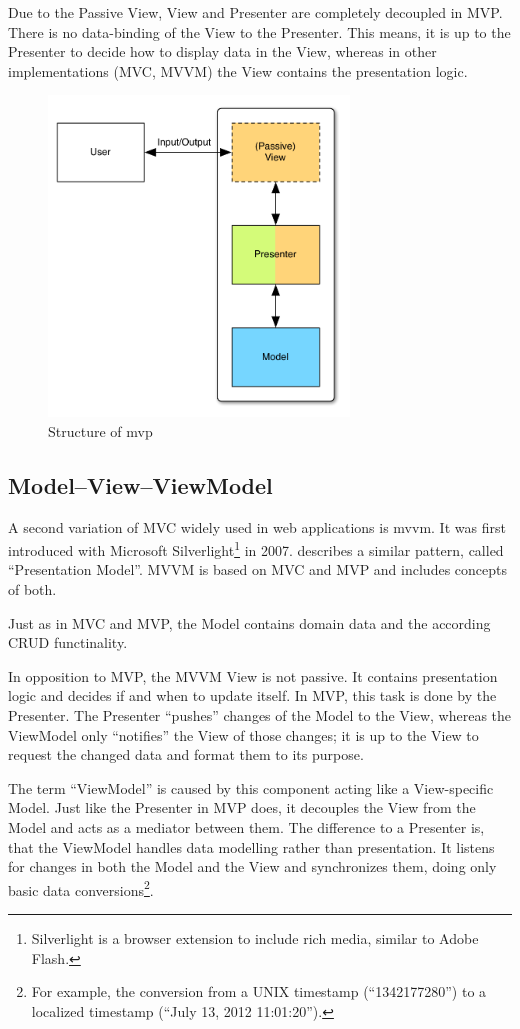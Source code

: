 Due to the Passive View, View and Presenter are completely decoupled in MVP. There is no data-binding of the View to the Presenter. This means, it is up to the Presenter to decide how to display data in the View, whereas in other implementations (MVC, MVVM) the View contains the presentation logic.

\begin{figure}[H]
	\centering
	\includegraphics[width=8cm]{images/mvp.pdf}
	\caption{Structure of \acl{mvp}}
	\label{fig:mvp}
\end{figure}

\subsection{Model--View--ViewModel}
A second variation of MVC widely used in web applications is \ac{mvvm}. It was first introduced with Microsoft Silverlight\footnote{Silverlight is a browser extension to include rich media, similar to Adobe Flash.} in 2007.  describes a similar pattern, called ``Presentation Model''. MVVM is based on MVC and MVP and includes concepts of both.

Just as in MVC and MVP, the Model contains domain data and the according CRUD functinality.

In opposition to MVP, the MVVM View is not passive. It contains presentation logic and decides if and when to update itself. In MVP, this task is done by the Presenter. The Presenter ``pushes'' changes of the Model to the View, whereas the ViewModel only ``notifies'' the View of those changes; it is up to the View to request the changed data and format them to its purpose.

The term ``ViewModel'' is caused by this component acting like a View-specific Model. Just like the Presenter in MVP does, it decouples the View from the Model and acts as a mediator between them. The difference to a Presenter is, that the ViewModel handles data modelling rather than presentation. It listens for changes in both the Model and the View and synchronizes them, doing only basic data conversions\footnote{For example, the conversion from a UNIX timestamp (``1342177280'') to a localized timestamp (``July 13, 2012 11:01:20'').}.

